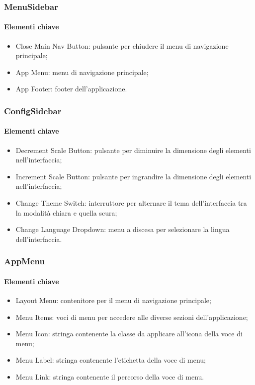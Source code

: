 \subsubsection{MenuSidebar}

\paragraph*{Elementi chiave}
\begin{itemize}
  \item Close Main Nav Button: pulsante per chiudere il menu di navigazione principale;
  \item App Menu: menu di navigazione principale;
  \item App Footer: footer dell'applicazione.
\end{itemize}

\subsubsection{ConfigSidebar}

\paragraph*{Elementi chiave}
\begin{itemize}
  \item Decrement Scale Button: pulsante per diminuire la dimensione degli elementi nell'interfaccia;
  \item Increment Scale Button: pulsante per ingrandire la dimensione degli elementi nell'interfaccia;
  \item Change Theme Switch: interruttore per alternare il tema dell'interfaccia tra la modalità chiara e quella scura;
  \item Change Language Dropdown: menu a discesa per selezionare la lingua dell'interfaccia.
\end{itemize}

\subsubsection{AppMenu}

\paragraph*{Elementi chiave}
\begin{itemize}
  \item Layout Menu: contenitore per il menu di navigazione principale;
  \item Menu Items: voci di menu per accedere alle diverse sezioni dell'applicazione;
  \item Menu Icon: stringa contenente la classe da applicare all'icona della voce di menu;
  \item Menu Label: stringa contenente l'etichetta della voce di menu;
  \item Menu Link: stringa contenente il percorso della voce di menu.
\end{itemize}

